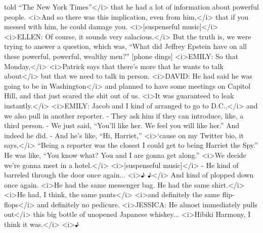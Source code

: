 \begin{itemize}
  told ``The New York Times''\textless{}/i\textgreater{} that he had a
  lot of information about powerful people.
  \textless{}i\textgreater{}And so there was this implication, even from
  him,\textless{}/i\textgreater{} that if you messed with him, he could
  damage you. \textless{}i\textgreater{}{[}suspenseful
  music{]}\textless{}/i\textgreater{} \textless{}i\textgreater{}ELLEN:
  Of course, it sounds very salacious.\textless{}/i\textgreater{} But
  the truth is, we were trying to answer a question, which was, ``What
  did Jeffrey Epstein have on all these powerful, powerful, wealthy
  men?'' {[}phone dings{]} \textless{}i\textgreater{}EMILY: So that
  Monday,\textless{}/i\textgreater{} \textless{}i\textgreater{}Patrick
  says that there's more that he wants to talk
  about\textless{}/i\textgreater{} but that we need to talk in person.
  \textless{}i\textgreater{}DAVID: He had said he was going to be in
  Washington\textless{}/i\textgreater{} and planned to have some
  meetings on Capitol Hill, and that just scared the shit out of us.
  \textless{}i\textgreater{}It was guaranteed to leak
  instantly.\textless{}/i\textgreater{} \textless{}i\textgreater{}EMILY:
  Jacob and I kind of arranged to go to D.C.,\textless{}/i\textgreater{}
  and we also pull in another reporter. - They ask him if they can
  introduce, like, a third person. - We just said, ``You'll like her. We
  feel you will like her.'' And indeed he did. - And he's like, ``Hi,
  Harriet,'' \textless{}i\textgreater{}`cause on my Twitter bio, it
  says,\textless{}/i\textgreater{} ``Being a reporter was the closest I
  could get to being Harriet the Spy.'' He was like, ``You know what?
  You and I are gonna get along.'' \textless{}i\textgreater{}We decide
  we're gonna meet in a hotel.\textless{}/i\textgreater{}
  \textless{}i\textgreater{}{[}suspenseful
  music{]}\textless{}/i\textgreater{} - He kind of barreled through the
  door once again... \textless{}i\textgreater{}♪
  ♪\textless{}/i\textgreater{} And kind of plopped down once again.
  \textless{}i\textgreater{}He had the same messenger bag. He had the
  same shirt.\textless{}/i\textgreater{} \textless{}i\textgreater{}He
  had, I think, the same pants\textless{}/i\textgreater{}
  \textless{}i\textgreater{}and definitely the same
  flip-flops\textless{}/i\textgreater{} and definitely no pedicure.
  \textless{}i\textgreater{}JESSICA: He almost immediately pulls
  out\textless{}/i\textgreater{} this big bottle of unopened Japanese
  whiskey... \textless{}i\textgreater{}Hibiki Harmony, I think it
  was.\textless{}/i\textgreater{} \textless{}i\textgreater{}♪

\end{itemize}
